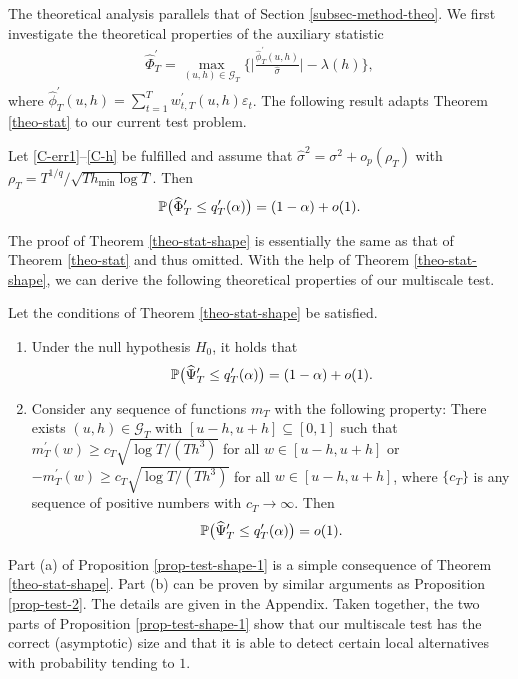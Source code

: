 The theoretical analysis parallels that of Section \ref{subsec-method-theo}. We first investigate the theoretical properties of the auxiliary statistic 
\begin{align*}
\widehat{\Phi}_T^\prime = \max_{(u,h) \in \mathcal{G}_T} \Big\{ \Big| \frac{\widehat{\phi}_T^\prime(u,h)}{\widehat{\sigma}} \Big| - \lambda(h) \Big\}, 
\end{align*}
where $\widehat{\phi}_T^\prime(u,h) = \sum_{t=1}^T w_{t,T}^\prime(u,h) \varepsilon_t$. The following result adapts Theorem \ref{theo-stat} to our current test problem. 
\begin{theorem}\label{theo-stat-shape}
Let \ref{C-err1}--\ref{C-h} be fulfilled and assume that $\widehat{\sigma}^2 = \sigma^2 + o_p(\rho_T)$ with $\rho_T = T^{1/q}/\sqrt{T h_{\min} \log T}$. Then
\[ \mathbb{P} \big( \widehat{\Phi}_T^\prime \le q_T^\prime(\alpha) \big) = (1 - \alpha) + o(1). \]
\end{theorem}
The proof of Theorem \ref{theo-stat-shape} is essentially the same as that of Theorem \ref{theo-stat} and thus omitted. With the help of Theorem \ref{theo-stat-shape}, we can derive the following theoretical properties of our multiscale test. 
\begin{prop}\label{prop-test-shape-1}
Let the conditions of Theorem \ref{theo-stat-shape} be satisfied. 
\begin{enumerate}[label=(\alph*),leftmargin=0.75cm]
\item Under the null hypothesis $H_0$, it holds that 
\[ \mathbb{P} \big( \widehat{\Psi}_T^\prime \le q_T^\prime(\alpha) \big) = (1 - \alpha) + o(1). \]
\item Consider any sequence of functions $m_T$ with the following property: There exists $(u,h) \in \mathcal{G}_T$ with $[u-h,u+h] \subseteq [0,1]$ such that $m_T^\prime(w) \ge c_T \sqrt{\log T/(Th^3)}$ for all $w \in [u-h,u+h]$ or $-m_T^\prime(w) \ge c_T \sqrt{\log T/(Th^3)}$ for all $w \in [u-h,u+h]$, where $\{c_T\}$ is any sequence of positive numbers with $c_T \rightarrow \infty$. Then 
\[ \mathbb{P} \big( \widehat{\Psi}_T^\prime \le q_T^\prime(\alpha) \big) = o(1). \]
\end{enumerate}
\end{prop}
Part (a) of Proposition \ref{prop-test-shape-1} is a simple consequence of Theorem \ref{theo-stat-shape}. Part (b) can be proven by similar arguments as Proposition \ref{prop-test-2}. The details are given in the Appendix. Taken together, the two parts of Proposition \ref{prop-test-shape-1} show that our multiscale test has the correct (asymptotic) size and that it is able to detect certain local alternatives with probability tending to $1$. 
